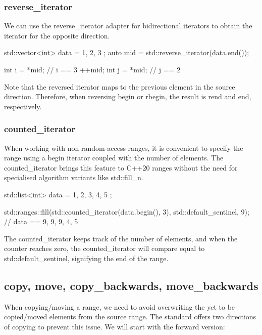 \subsubsection{reverse\_iterator}

We can use the reverse\_iterator adapter for bidirectional iterators to obtain the iterator for the opposite direction.

\begin{box-note}
\begin{cppcode}
std::vector<int> data = { 1, 2, 3 };
auto mid = std::reverse_iterator(data.end());

int i = *mid; // i == 3
++mid;
int j = *mid; // j == 2
\end{cppcode}
\end{box-note}

Note that the reversed iterator maps to the previous element in the source direction. Therefore, when reversing begin or rbegin, the result is rend and end, respectively.

\subsubsection{counted\_iterator}

When working with non-random-access ranges, it is convenient to specify the range using a begin iterator coupled with the number of elements. The counted\_iterator brings this feature to C++20 ranges without the need for specialised algorithm variants like std::fill\_n.

\begin{box-note}
\begin{cppcode}
std::list<int> data = { 1, 2, 3, 4, 5 };

std::ranges::fill(std::counted_iterator(data.begin(), 3), std::default_sentinel, 9);
// data == { 9, 9, 9, 4, 5 }
\end{cppcode}
\end{box-note}

The counted\_iterator keeps track of the number of elements, and when the counter reaches zero, the counted\_iterator will compare equal to std::default\_sentinel, signifying the end of the range.

\subsection{copy, move, copy\_backwards, move\_backwards}

When copying/moving a range, we need to avoid overwriting the yet to be copied/moved elements from the source range. The standard offers two directions of copying to prevent this issue. We will start with the forward version:

